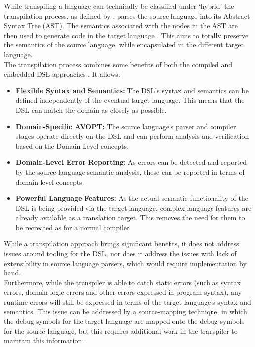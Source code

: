 While transpiling a language can technically be classified under `hybrid' the transpilation process, as defined by \citet{Mernik:2005:DDL:1118890.1118892}, parses the source language into its Abstract Syntax Tree (AST).
The semantics associated with the nodes in the AST are then used to generate code in the target language \citep[pg. 4]{Bouraqadi:2016:MPT:2991041.2991051}.
This aims to totally preserve the semantics of the source language, while encapsulated in the different target language. \\

The transpilation process combines some benefits of both the compiled and embedded DSL approaches \citep{kulkarnitranspiler}.
It allows:
\begin{itemize}
    \item \textbf{Flexible Syntax and Semantics:} The DSL's syntax and semantics can be defined independently of the eventual target language. 
    This means that the DSL can match the domain as closely as possible. 
    \item \textbf{Domain-Specific AVOPT:} The source language's parser and compiler stages operate directly on the DSL and can perform analysis and verification based on the Domain-Level concepts. 
    \item \textbf{Domain-Level Error Reporting:} As errors can be detected and reported by the source-language semantic analysis, these can be reported in terms of domain-level concepts. 
    \item \textbf{Powerful Language Features:} As the actual semantic functionality of the DSL is being provided via the target language, complex language features are already available as a translation target.
    This removes the need for them to be recreated as for a normal compiler. 
\end{itemize}

While a transpilation approach brings significant benefits, it does not address issues around tooling for the DSL, nor does it address the issues with lack of extensibility in source language parsers, which would require implementation by hand. \\

Furthermore, while the transpiler is able to catch static errors (such as syntax errors, domain-logic errors and other errors expressed in program syntax), any runtime errors will still be expressed in terms of the target language's syntax and semantics. 
This issue can be addressed by a source-mapping technique, in which the debug symbols for the target language are mapped onto the debug symbols for the source language, but this requires additional work in the transpiler to maintain this information \citep{kulkarnitranspiler}.

